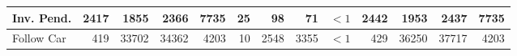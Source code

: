 {\begin{tabular}{|l|rrrr|rrrr|rrrr|}
\hline
Inv. Pend. & 2417 & 1855 & 2366 & 7735 & 25 & 98 & 71 & ${<}1$ & 2442 & 1953 & 2437 & 7735 \\
\hline
Follow Car & 419 & 33702 & 34362 & 4203 & 10 & 2548 & 3355 & ${<}1$ & 429 & 36250 & 37717 & 4203 \\
\hline
\end{tabular}}






